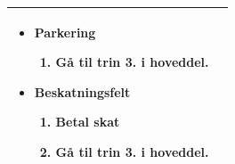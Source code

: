 \begin{center}
\begin{longtable}{|l|p{11cm}|}
\begin{minipage}[t]{1\textwidth}
\begin{itemize}
     \item Parkering
     \begin{enumerate}
         \item Gå til trin 3. i hoveddel.
     \end{enumerate}
     \item Beskatningsfelt
     \begin{enumerate}
         \item Betal skat
         \item Gå til trin 3. i hoveddel.
     \end{enumerate}
 \end{itemize}
\end{minipage}

\\
\hline
\end{longtable}
\end{center}



